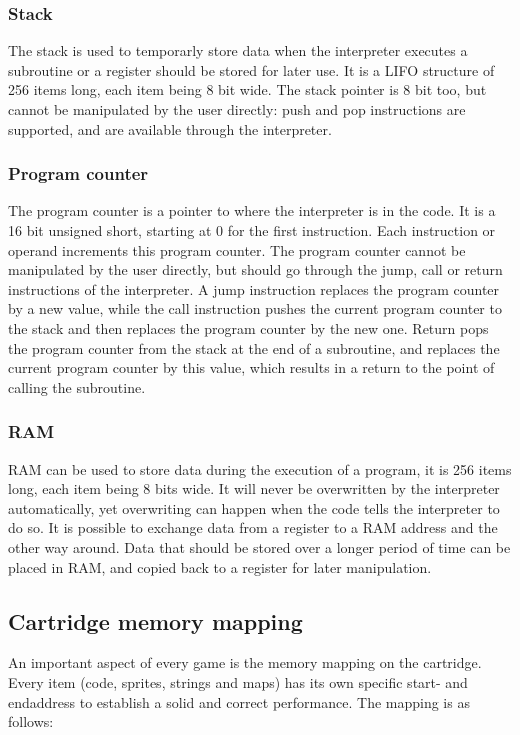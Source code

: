 		\subsubsection{Stack}
			\par The stack is used to temporarly store data when the interpreter executes a subroutine or a register should be stored for later use.
			It is a LIFO structure of 256 items long, each item being 8 bit wide.
			The stack pointer is 8 bit too, but cannot be manipulated by the user directly: push and pop instructions are supported, and are available through the interpreter.

		\subsubsection{Program counter}
			\par The program counter is a pointer to where the interpreter is in the code.
			It is a 16 bit unsigned short, starting at 0 for the first instruction.
			Each instruction or operand increments this program counter.
			The program counter cannot be manipulated by the user directly, but should go through the jump, call or return instructions of the interpreter.
			A jump instruction replaces the program counter by a new value, while the call instruction pushes the current program counter to the stack and then replaces the program counter by the new one.
			Return pops the program counter from the stack at the end of a subroutine, and replaces the current program counter by this value, which results in a return to the point of calling the subroutine.

		\subsubsection{RAM}
			\par RAM can be used to store data during the execution of a program, it is 256 items long, each item being 8 bits wide.
			It will never be overwritten by the interpreter automatically, yet overwriting can happen when the code tells the interpreter to do so.
			It is possible to exchange data from a register to a RAM address and the other way around.
			Data that should be stored over a longer period of time can be placed in RAM, and copied back to a register for later manipulation.

	\subsection{Cartridge memory mapping}
		\par An important aspect of every game is the memory mapping on the cartridge.
		Every item (code, sprites, strings and maps) has its own specific start- and endaddress to establish a solid and correct performance. The mapping is as follows:

